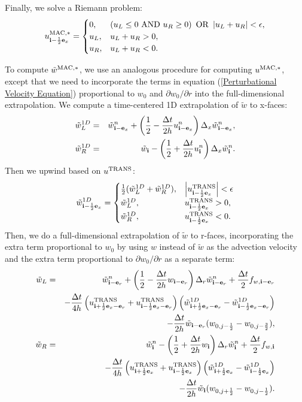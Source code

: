 \documentclass[11pt]{article}
\def\half  {\frac{1}{2}}
\def\dt    {\Delta t}
\def\mac   {\rm MAC}
\def\trans {\rm TRANS}
\def\eb    {{\bf e}}
\def\ib    {{\bf i}}
\def\wt    {\tilde{w}}
\begin{document}
Finally, we solve a Riemann problem:
\begin{equation}
u_{\ib-\half\eb_x}^{\mac,*} =
\begin{cases}
0, & \left(u_L \le 0 ~ {\rm AND} ~ u_R \ge 0\right) ~ {\rm OR} ~ \left|u_L + u_R\right| < \epsilon, \\
u_L, & u_L + u_R > 0, \\
u_R, & u_L + u_R < 0. 
\end{cases}
\end{equation}

To compute $\wt^{\mac,*}$, we use an analogous procedure for computing $u^{\mac,*}$, except that we need to incorporate the terms in equation (\ref{Perturbational Velocity Equation}) proportional to $w_0$ and $\partial w_0/\partial r$ into the full-dimensional extrapolation.  We compute a time-centered 1D extrapolation of $\wt$ to x-faces:
\begin{eqnarray}
\wt_L^{1D} &=& \wt_{\ib-\eb_x}^n + \left(\half - \frac{\dt}{2h}u_{\ib-\eb_x}^n\right)\Delta_x \wt_{\ib-\eb_x}^n, \\
\wt_R^{1D} &=& \wt_{\ib} - \left(\half + \frac{\dt}{2h}u_{\ib}^n\right)\Delta_x \wt_{\ib}^n.
\end{eqnarray}
Then we upwind based on $u^{\trans}$:
\begin{equation}
\wt_{\ib-\half\eb_x}^{1D} =
\begin{cases}
\half(\wt_L^{1D} + \wt_R^{1D}), & \left|u^{\trans}_{\ib-\half\eb_x}\right| < \epsilon \\
\wt_L^{1D}, & u^{\trans}_{\ib-\half\eb_x} > 0, \\
\wt_R^{1D}, & u^{\trans}_{\ib-\half\eb_x} < 0. \\
\end{cases}
\end{equation}
Then, we do a full-dimensional extrapolation of $\wt$ to r-faces, incorporating the extra term proportional to $w_0$ by using $w$ instead of $\wt$ as the advection velocity and the extra term proportional to $\partial w_0/\partial r$ as a separate term:
\begin{eqnarray}
\wt_L &=& \wt_{\ib-\eb_r}^n + \left(\half - \frac{\dt}{2h}w_{\ib-\eb_r}\right)\Delta_r \wt_{\ib-\eb_r}^n + \frac{\dt}{2}f_{w,\ib-\eb_r} \nonumber \\
&& - \frac{\dt}{4h}\left(u_{\ib+\half\eb_x-\eb_r}^{\trans}+u_{\ib-\half\eb_x-\eb_r}^{\trans}\right)\left(\wt_{\ib+\half\eb_x-\eb_r}^{1D} - \wt_{\ib-\half\eb_x-\eb_r}^{1D}\right) \nonumber \\
&& - \frac{\dt}{2h}\wt_{\ib-\eb_r}(w_{0,j-\half} - w_{0,j-\frac{3}{2}}),\label{wt_L Extrapolation} \\
\wt_R &=& \wt_{\ib}^n - \left(\half + \frac{\dt}{2h}w_{\ib}\right)\Delta_r \wt_{\ib}^n + \frac{\dt}{2}f_{w,\ib} \nonumber \\
&& - \frac{\dt}{4h}\left(u_{\ib+\half\eb_x}^{\trans}+u_{\ib-\half\eb_x}^{\trans}\right)\left(\wt_{\ib+\half\eb_x}^{1D} - \wt_{\ib-\half\eb_x}^{1D}\right) \nonumber \\
&& - \frac{\dt}{2h}\wt_{\ib}(w_{0,j+\half} - w_{0,j-\half}).\label{wt_R Extrapolation}
\end{eqnarray}
\end{document}
